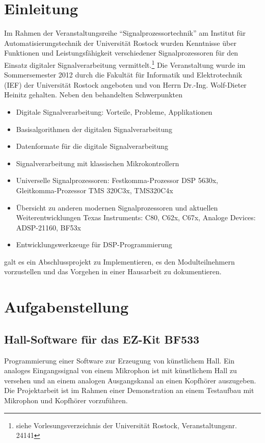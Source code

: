 \documentclass[a4paper,12pt,fontsize=12,DIV=12]{scrartcl}
\begin{document}
\onehalfspacing

\pagestyle{plain}


\section{Einleitung}
Im Rahmen der Veranstaltungsreihe "`Signalprozessortechnik"' am Institut für Automatisierungstechnik der Universität Rostock wurden Kenntnisse über Funktionen und Leistungsfähigkeit verschiedener Signalprozessoren für den Einsatz digitaler Signalverarbeitung vermittelt.\footnote{siehe Vorlesungsverzeichnis der Universität Rostock, Veranstaltungsnr. 24141 }
Die Veranstaltung wurde im Sommersemester 2012 durch die Fakultät für Informatik und Elektrotechnik (IEF) der Universität Rostock angeboten und von Herrn Dr.-Ing. Wolf-Dieter Heinitz gehalten.
Neben den behandelten Schwerpunkten

 \begin{itemize} 
\item Digitale Signalverarbeitung: Vorteile, Probleme, Applikationen
\item Basisalgorithmen der digitalen Signalverarbeitung
\item Datenformate für die digitale Signalverarbeitung
\item Signalverarbeitung mit klassischen Mikrokontrollern
\item Universelle Signalprozessoren: Festkomma-Prozessor DSP 5630x, Gleitkomma-Prozessor TMS 320C3x, TMS320C4x
\item Übersicht zu anderen modernen Signalprozessoren und aktuellen Weiterentwicklungen Texas Instruments: C80, C62x, C67x, Analoge Devices: ADSP-21160, BF53x
\item Entwicklungswerkzeuge für DSP-Programmierung
\end{itemize}

galt es ein Abschlussprojekt zu Implementieren, es den Modulteilnehmern vorzustellen und das Vorgehen in einer Hausarbeit zu dokumentieren.

\section{Aufgabenstellung}

\subsection{Hall-Software für das EZ-Kit BF533}
Programmierung einer Software zur Erzeugung von künstlichem Hall. Ein analoges Eingangssignal von einem Mikrophon ist mit künstlichem Hall zu versehen und an einem analogen Ausgangskanal an einen Kopfhörer auszugeben.
\newline
Die Projektarbeit ist im Rahmen einer Demonstration an einem Testaufbau mit Mikrophon und Kopfhörer vorzuführen.
\end{document}
